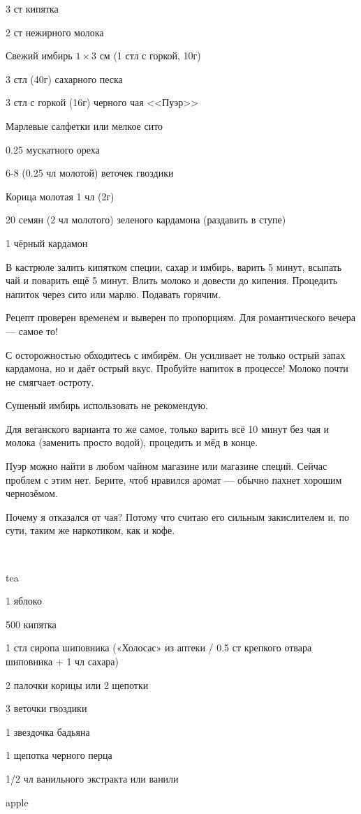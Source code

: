


{
\item 3 ст кипятка
\item 2 ст нежирного молока
\item Свежий имбирь $1\times 3$ см (1 стл с горкой, 10г)
\item 3 стл (40г) сахарного песка
\item 3 стл с горкой (16г) черного чая <<Пуэр>>
\item Марлевые салфетки или мелкое сито
}{
\item 0.25 мускатного ореха
\item 6-8 (0.25 чл молотой) веточек гвоздики 
\item Корица молотая 1 чл (2г)
\item 20 семян (2 чл молотого) зеленого кардамона  (раздавить в ступе)  
\item 1 чёрный кардамон 
}{
В кастрюле залить кипятком специи, сахар и имбирь, варить 5 минут, всыпать чай и поварить ещё 5 минут. Влить молоко и довести до кипения. Процедить напиток через сито или марлю. Подавать горячим.
}{
\begin{advice}
\item Рецепт проверен временем и выверен по пропорциям. Для романтического вечера — самое то!
\item С осторожностью обходитесь с имбирём. Он усиливает не только острый запах кардамона, но и даёт острый вкус. Пробуйте напиток в процессе! Молоко почти не смягчает остроту. 
    \item Сушеный имбирь использовать не рекомендую.
    \item Для веганского варианта то же самое, только варить всё 10 минут без чая и молока (заменить просто водой), процедить и мёд в конце.
            \item Пуэр можно найти в любом чайном магазине или магазине специй. Сейчас проблем с этим нет. Берите, чтоб нравился аромат — обычно пахнет хорошим чернозёмом.
                \item Почему я отказался от чая? Потому что считаю его сильным закислителем и, по сути, таким же наркотиком, как и кофе.
\end{advice}
\newpage
~
}{tea}





{
\item 1 яблоко
\item 500 кипятка
\item 1 стл сиропа шиповника («Холосас» из аптеки / 0.5 ст крепкого отвара шиповника + 1 чл сахара)

}{
\item 2 палочки корицы или 2 щепотки
\item 3 веточки гвоздики
\item 1 звездочка бадьяна
\item 1 щепотка черного перца
\item 1/2 чл ванильного экстракта или ванили
}{%
}{}{apple}




